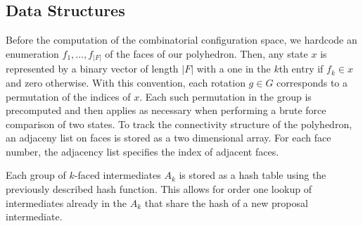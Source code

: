 \subsection{Data Structures}

Before the computation of the combinatorial configuration space, we hardcode an enumeration $f_1, \dots, f_{|F|}$ of the faces of our polyhedron. Then, any state $x$ is represented by a binary vector of length $|F|$ with a one in the $k$th entry if $f_k \in x$ and zero otherwise. With this convention, each rotation $g \in G$ corresponds to a permutation of the indices of $x$. Each such permutation in the group is precomputed and then applies as necessary when performing a brute force comparison of two states. To track the connectivity structure of the polyhedron, an adjaceny list on faces is stored as a two dimensional array. For each face number, the adjacency list specifies the index of adjacent faces.

Each group of $k$-faced intermediates $A_k$ is stored as a hash table using the previously described hash function. This allows for order one lookup of intermediates already in the $A_k$ that share the hash of a new proposal intermediate. 


